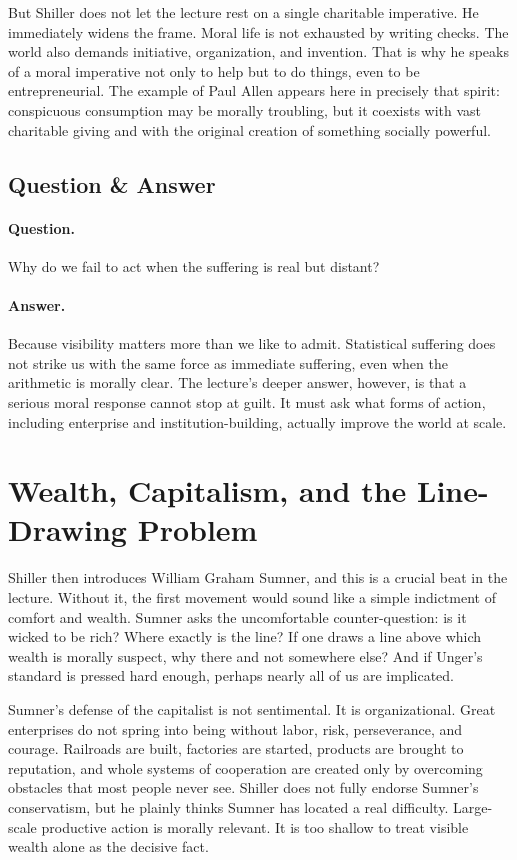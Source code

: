 But Shiller does not let the lecture rest on a single charitable imperative. He immediately widens the frame. Moral life is not exhausted by writing checks. The world also demands initiative, organization, and invention. That is why he speaks of a moral imperative not only to help but to do things, even to be entrepreneurial. The example of Paul Allen appears here in precisely that spirit: conspicuous consumption may be morally troubling, but it coexists with vast charitable giving and with the original creation of something socially powerful.

\subsection{Question \& Answer}

\paragraph{Question.} Why do we fail to act when the suffering is real but distant?

\paragraph{Answer.} Because visibility matters more than we like to admit. Statistical suffering does not strike us with the same force as immediate suffering, even when the arithmetic is morally clear. The lecture's deeper answer, however, is that a serious moral response cannot stop at guilt. It must ask what forms of action, including enterprise and institution-building, actually improve the world at scale.

\section{Wealth, Capitalism, and the Line-Drawing Problem}

Shiller then introduces William Graham Sumner, and this is a crucial beat in the lecture. Without it, the first movement would sound like a simple indictment of comfort and wealth. Sumner asks the uncomfortable counter-question: is it wicked to be rich? Where exactly is the line? If one draws a line above which wealth is morally suspect, why there and not somewhere else? And if Unger's standard is pressed hard enough, perhaps nearly all of us are implicated.

Sumner's defense of the capitalist is not sentimental. It is organizational. Great enterprises do not spring into being without labor, risk, perseverance, and courage. Railroads are built, factories are started, products are brought to reputation, and whole systems of cooperation are created only by overcoming obstacles that most people never see. Shiller does not fully endorse Sumner's conservatism, but he plainly thinks Sumner has located a real difficulty. Large-scale productive action is morally relevant. It is too shallow to treat visible wealth alone as the decisive fact.

